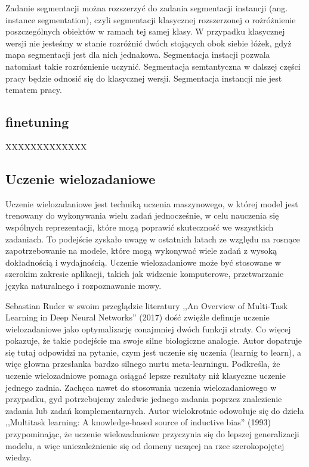 Zadanie segmentacji można rozszerzyć do zadania segmentacji instancji (ang. instance segmentation), czyli segmentacji klasycznej rozszerzonej o rożróżnienie poszczególnych obiektów w ramach tej samej klasy. W przypadku klasycznej wersji nie jesteśmy w stanie rozróżnić dwóch stojących obok siebie łóżek, gdyż mapa segmentacji jest dla nich jednakowa. Segmentacja instacji pozwala natomiast takie rozróznienie uczynić. Segmentacja semtantyczna w dalszej części pracy będzie odnosić się do klasycznej wersji. Segmentacja instancji nie jest tematem pracy.

\subsection{finetuning}

XXXXXXXXXXXXX
\subsection{Uczenie wielozadaniowe}
Uczenie wielozadaniowe jest techniką uczenia maszynowego, w której model jest trenowany do wykonywania wielu zadań jednocześnie, w celu nauczenia się wspólnych reprezentacji, które mogą poprawić skuteczność we wszystkich zadaniach. To podejście zyskało uwagę w ostatnich latach ze względu na rosnące zapotrzebowanie na modele, które mogą wykonywać wiele zadań z wysoką dokładnością i wydajnością. Uczenie wielozadaniowe może być stosowane w szerokim zakresie aplikacji, takich jak widzenie komputerowe, przetwarzanie języka naturalnego i rozpoznawanie mowy.

Sebastian Ruder w swoim przeglądzie literatury ,,An Overview of Multi-Task Learning in Deep Neural Networks'' (2017) \cite{ruder2017overview} dość zwięźle definuje uczenie wielozadaniowe jako optymalizację conajmniej dwóch funkcji straty. Co więcej pokazuje, że takie podejście ma swoje silne biologiczne analogie. Autor dopatruje się tutaj odpowidzi na pytanie, czym jest uczenie się uczenia (learnig to learn), a więc głowna przesłanka bardzo silnego nurtu meta-learningu. Podkreśla, że uczenie wielozadniowe pomaga osiągać lepsze rezultaty niż klasyczne uczenie jednego zadnia. Zachęca nawet do stosowania uczenia wielozadaniowego w przypadku, gyd potrzebujemy zaledwie jednego zadania poprzez znalezienie zadania lub zadań komplementarnych. Autor wielokrotnie odowołuje się do dzieła ,,Multitask learning: A knowledge-based source of inductive bias'' (1993) \cite{caruana1993multitask} przypominając, że uczenie wielozadaniowe przyczynia się do lepszej generalizacji modelu, a więc uniezależnienie się od domeny uczącej na rzec szerokopojętej wiedzy.

